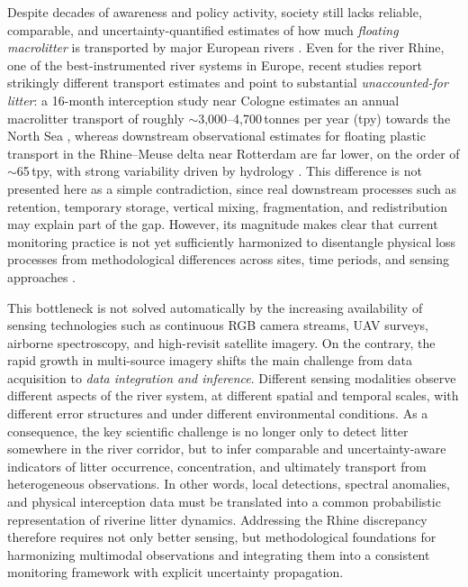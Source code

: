 \documentclass{scrartcl}
\begin{document}
Despite decades of awareness and policy activity, society still lacks reliable, comparable, and uncertainty-quantified estimates of how much \emph{floating macrolitter} is transported by major European rivers \citep{gonzalez2021floating,weiss2021missing,oswald2026}. Even for the river Rhine, one of the best-instrumented river systems in Europe, recent studies report strikingly different transport estimates and point to substantial \emph{unaccounted-for litter}: a 16-month interception study near Cologne estimates an annual macrolitter transport of roughly \(\sim\)3{,}000--4{,}700\,tonnes per year (tpy) towards the North Sea \citep{gnann2026river}, whereas downstream observational estimates for floating plastic transport in the Rhine--Meuse delta near Rotterdam are far lower, on the order of \(\sim\)65\,tpy, with strong variability driven by hydrology \citep{van2022hydrology}. This difference is not presented here as a simple contradiction, since real downstream processes such as retention, temporary storage, vertical mixing, fragmentation, and redistribution may explain part of the gap. However, its magnitude makes clear that current monitoring practice is not yet sufficiently harmonized to disentangle physical loss processes from methodological differences across sites, time periods, and sensing approaches \citep{Gallitelli2024,smith2025insights,oswald2026}.

This bottleneck is not solved automatically by the increasing availability of sensing technologies such as continuous RGB camera streams, UAV surveys, airborne spectroscopy, and high-revisit satellite imagery. On the contrary, the rapid growth in multi-source imagery shifts the main challenge from data acquisition to \emph{data integration and inference}. Different sensing modalities observe different aspects of the river system, at different spatial and temporal scales, with different error structures and under different environmental conditions. As a consequence, the key scientific challenge is no longer only to detect litter somewhere in the river corridor, but to infer comparable and uncertainty-aware indicators of litter occurrence, concentration, and ultimately transport from heterogeneous observations. In other words, local detections, spectral anomalies, and physical interception data must be translated into a common probabilistic representation of riverine litter dynamics. Addressing the Rhine discrepancy therefore requires not only better sensing, but methodological foundations for harmonizing multimodal observations and integrating them into a consistent monitoring framework with explicit uncertainty propagation.
\end{document}
